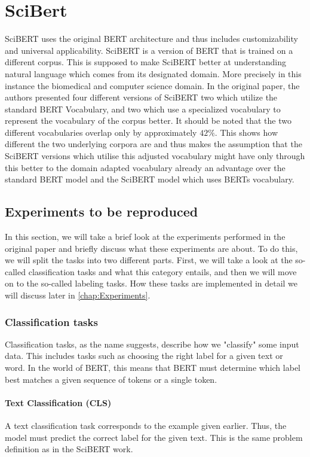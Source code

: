 \chapter{SciBert}
SciBERT uses the original BERT architecture and thus includes customizability and universal applicability. SciBERT is a version of BERT that is trained on a different corpus. This is supposed to make SciBERT better at understanding natural language which comes from its designated domain. More precisely in this instance the biomedical and computer science domain. In the original paper, the authors presented four different versions of SciBERT two which utilize the standard BERT Vocabulary, and two which use a specialized vocabulary to represent the vocabulary of the corpus better. It should be noted that the two different vocabularies overlap only by approximately $42\%$. This shows how different the two underlying corpora are and thus makes the assumption that the SciBERT versions which utilise this adjusted vocabulary might have only through this better to the domain adapted vocabulary already an advantage over the standard BERT model and the SciBERT model which uses BERTs vocabulary.

\section{Experiments to be reproduced}
In this section, we will take a brief look at the experiments performed in the original paper and briefly discuss what these experiments are about. To do this, we will split the tasks into two different parts. First, we will take a look at the so-called classification tasks and what this category entails, and then we will move on to the so-called labeling tasks. How these tasks are implemented in detail we will discuss later in \autoref{chap:Experiments}.
\subsection{Classification tasks}
Classification tasks, as the name suggests, describe how we "classify" some input data. This includes tasks such as choosing the right label for a given text or word. In the world of BERT, this means that BERT must determine which label best matches a given sequence of tokens or a single token. 
\subsubsection{Text Classification (CLS)}
A text classification task corresponds to the example given earlier. Thus, the model must predict the correct label for the given text. This is the same problem definition as in the SciBERT work.
